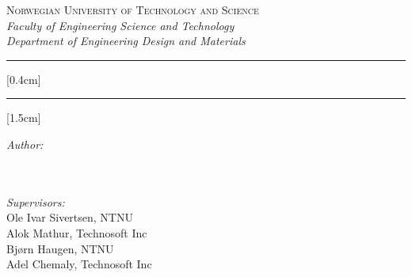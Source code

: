 \begin{titlepage}

\newcommand{\HRule}{\rule{\linewidth}{0.3mm}} %

\textsc{\large Norwegian University of Technology and Science}\\[0.2cm] %
\slshape{\normalsize Faculty of Engineering Science and Technology}\\[0.1cm] %
\slshape{\normalsize Department of Engineering Design and Materials}\\[0.1cm] %


\HRule[0.4cm]
{ \LARGE \bfseries \textup{\mytitle}}\\[0.4cm] %
\HRule[1.5cm]


\begin{minipage}{0.4\textwidth}
\begin{flushleft} \small
\emph{Author:}\\
{\myauthorA} \\
{\myauthorB} \\
\phantom{A}
\end{flushleft}
\end{minipage}

\begin{minipage}{0.4\textwidth}
\begin{flushright} \small
\emph{Supervisors:} \\
Ole Ivar Sivertsen, NTNU \\%
Alok Mathur, Technosoft Inc \\
Bjørn Haugen, NTNU \\
Adel Chemaly, Technosoft Inc \\
\end{flushright}
\end{minipage}\\[7cm]


\end{titlepage}
